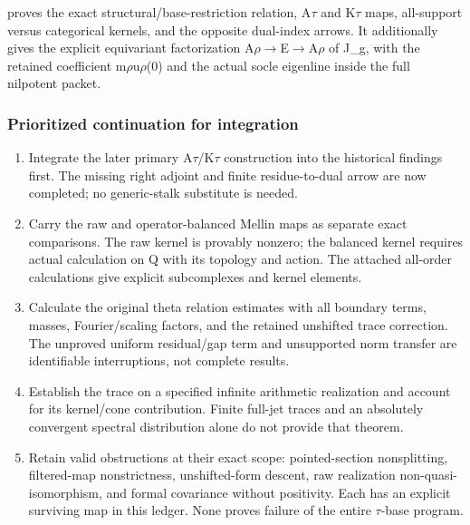 \protect{} proves the exact
structural/base-restriction relation,
A\allowbreak{}\ensuremath{τ}\allowbreak{} and
K\allowbreak{}\ensuremath{τ}\allowbreak{} maps, all-support versus
categorical kernels, and the opposite dual-index arrows. It additionally
gives the explicit equivariant factorization
A\allowbreak{}\ensuremath{ρ}\allowbreak{}\allowbreak{}\ensuremath{→}\allowbreak{}E\allowbreak{}\ensuremath{→}\allowbreak{}A\allowbreak{}\ensuremath{ρ}\allowbreak{}
of J\_g, with the retained coefficient
m\allowbreak{}\ensuremath{ρ}\allowbreak{}u\allowbreak{}\ensuremath{ρ}\allowbreak{}(0)
and the actual socle eigenline inside the full nilpotent packet.

\subsubsection{Prioritized continuation for
integration}\label{prioritized-continuation-for-integration}

\begin{enumerate}
\def\labelenumi{\arabic{enumi}.}
\tightlist
\item
  Integrate the later primary
  A\allowbreak{}\ensuremath{τ}\allowbreak{}/K\allowbreak{}\ensuremath{τ}\allowbreak{}
  construction into the historical findings first. The missing right
  adjoint and finite residue-to-dual arrow are now completed; no
  generic-stalk substitute is needed.
\item
  Carry the raw and operator-balanced Mellin maps as separate exact
  comparisons. The raw kernel is provably nonzero; the balanced kernel
  requires actual calculation on Q with its topology and action. The
  attached all-order calculations give explicit subcomplexes and kernel
  elements.
\item
  Calculate the original theta relation estimates with all boundary
  terms, masses, Fourier/scaling factors, and the retained unshifted
  trace correction. The unproved uniform residual/gap term and
  unsupported norm transfer are identifiable interruptions, not complete
  results.
\item
  Establish the trace on a specified infinite arithmetic realization and
  account for its kernel/cone contribution. Finite full-jet traces and
  an absolutely convergent spectral distribution alone do not provide
  that theorem.
\item
  Retain valid obstructions at their exact scope: pointed-section
  nonsplitting, filtered-map nonstrictness, unshifted-form descent, raw
  realization non-quasi-isomorphism, and formal covariance without
  positivity. Each has an explicit surviving map in this ledger. None
  proves failure of the entire
  \allowbreak{}\ensuremath{τ}\allowbreak{}-base program.
\end{enumerate}

